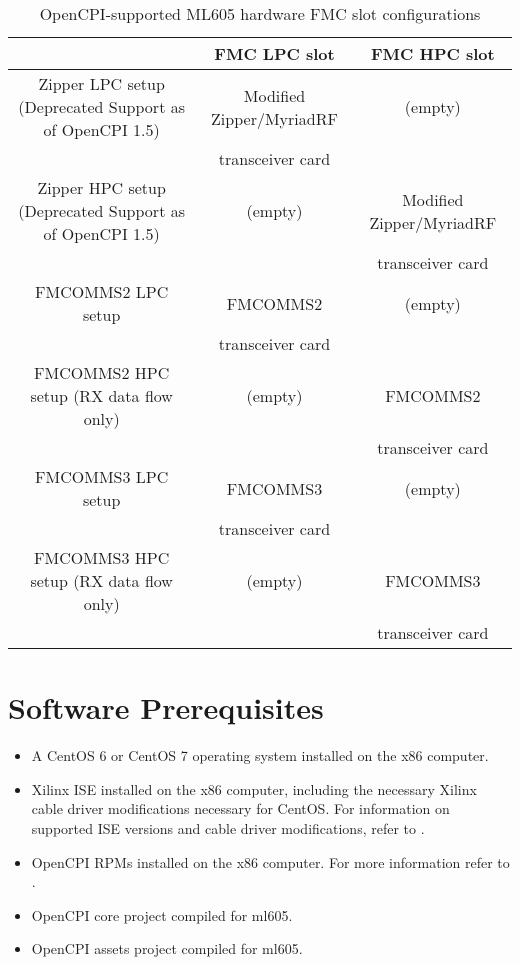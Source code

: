 \documentclass{article}
\begin{document}
\begin{center}
        \begin{table}[!htbp]
        \centering
        \caption{OpenCPI-supported ML605 hardware FMC slot configurations}
        \label{table:supported_slots}
        \begin{tabular}{|c|c|c|}
                \cline{2-3} \hline
                 & FMC LPC slot & FMC HPC slot \\ \hline
                \multicolumn{1}{|c|}{Zipper LPC setup (Deprecated Support as of OpenCPI 1.5)} & Modified\cite{zipper_mods} Zipper/MyriadRF & (empty)\\ 
                \multicolumn{1}{|c|}{ } & transceiver card & \\ \hline
                \multicolumn{1}{|c|}{Zipper HPC setup (Deprecated Support as of OpenCPI 1.5)} & (empty) & Modified\cite{zipper_mods} Zipper/MyriadRF \\
                \multicolumn{1}{|c|}{ } & & transceiver card \\ \hline
                \multicolumn{1}{|c|}{FMCOMMS2 LPC setup} & FMCOMMS2 & (empty)\\
                \multicolumn{1}{|c|}{ } & transceiver card & \\ \hline
                \multicolumn{1}{|c|}{FMCOMMS2 HPC setup (RX data flow only)} & (empty) & FMCOMMS2 \\
                \multicolumn{1}{|c|}{ } & & transceiver card \\ \hline
                \multicolumn{1}{|c|}{FMCOMMS3 LPC setup} & FMCOMMS3 & (empty)\\
                \multicolumn{1}{|c|}{ } & transceiver card & \\ \hline
                \multicolumn{1}{|c|}{FMCOMMS3 HPC setup (RX data flow only)} & (empty) & FMCOMMS3 \\
                \multicolumn{1}{|c|}{ } & & transceiver card \\ \hline
        \end{tabular}
        \end{table}
\end{center}

\section{Software Prerequisites}
\begin{itemize}
\item A CentOS 6 or CentOS 7 operating system installed on the x86 computer.
\item Xilinx ISE installed on the x86 computer, including the necessary Xilinx cable driver modifications necessary for CentOS. For information on supported ISE versions and cable driver modifications, refer to \cite{fpga_vendor_tool_guide}.
\item OpenCPI RPMs installed on the x86 computer. For more information refer to \cite{rpm_installation_guide}.
\item OpenCPI core project compiled for ml605.
\item OpenCPI assets project compiled for ml605.
\end{itemize}
\end{document}
